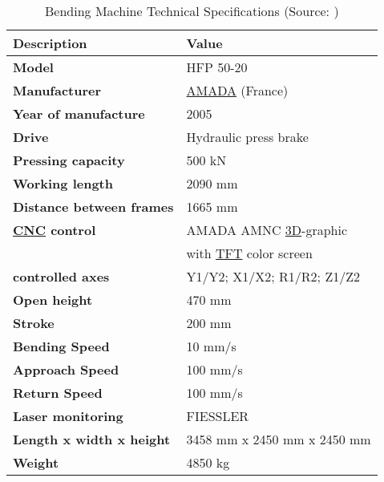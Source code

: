 \begin{table}[h!]
    \centering
    \renewcommand{\arraystretch}{1.2} %
    \small
    \begin{tabular}{ll}
        {\textbf{Description}} & {\textbf{Value}} \\
        \hline
        \textbf{Model} & HFP 50-20 \\
        \textbf{Manufacturer} & \hyperref[acro:AMADA]{AMADA} (France) \\
        \textbf{Year of manufacture} & 2005 \\
        \textbf{Drive} & Hydraulic press brake \\
        \textbf{Pressing capacity} & 500 kN \\
        \textbf{Working length} & 2090 mm \\
        \textbf{Distance between frames} & 1665 mm \\
        \textbf{\hyperref[acro:CNC]{CNC} control} & AMADA AMNC \hyperref[acro:3D]{3D}-graphic \\
        & with \hyperref[acro:TFT]{TFT} color screen \\
        \textbf{controlled axes} &  Y1/Y2; X1/X2; R1/R2; Z1/Z2 \\
        \textbf{Open height} & 470 mm \\
        \textbf{Stroke} & 200 mm \\
        \textbf{Bending Speed} & 10 mm/s \\
        \textbf{Approach Speed} & 100 mm/s \\
        \textbf{Return Speed} & 100 mm/s \\
        \textbf{Laser monitoring} & FIESSLER \\
        \textbf{Length x width x height} & 3458 mm x 2450 mm x 2450 mm \\
        \textbf{Weight} & 4850 kg \\ \hline
    \end{tabular}
    \caption{Bending Machine Technical Specifications (Source: \cite{bmspecifications})}
    \label{tab:machine_specifications}
\end{table}

